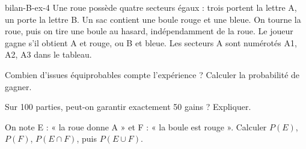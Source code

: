 \begin{blocEdition}{bilan-B-ex-4}
Une roue possède quatre secteurs égaux : trois portent la lettre A, un porte la lettre B. Un sac contient une boule rouge et une bleue. On tourne la roue, puis on tire une boule au hasard, indépendamment de la roue. Le joueur gagne s’il obtient A et rouge, ou B et bleue. Les secteurs A sont numérotés A1, A2, A3 dans le tableau.\begin{questions}
\item Combien d’issues équiprobables compte l’expérience ? Calculer la probabilité de gagner.
\item Sur 100 parties, peut-on garantir exactement 50 gains ? Expliquer.
\item On note E : « la roue donne A » et F : « la boule est rouge ». Calculer $P(E)$, $P(F)$, $P(E\cap F)$, puis $P(E\cup F)$.
\end{questions}\par{}\label{fig-bilan-B-ex-4}

\end{blocEdition}

